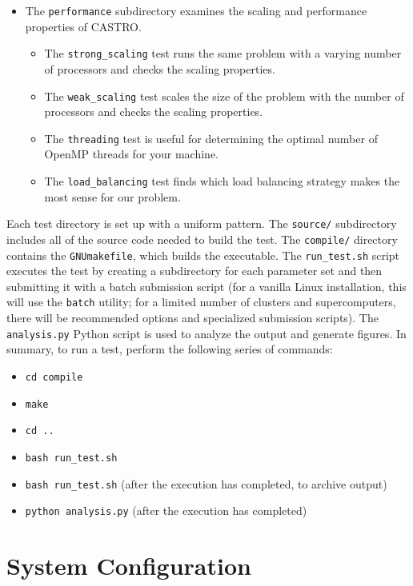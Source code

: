 \documentclass[12pt]{book}
\begin{document}
\begin{itemize}
  \item The \texttt{performance} subdirectory examines the scaling and performance properties of CASTRO.
  \begin{itemize}
    \item The \texttt{strong\_scaling} test runs the same problem with a varying number of processors and 
      checks the scaling properties.
    \item The \texttt{weak\_scaling} test scales the size of the problem with the number of processors and
      checks the scaling properties.
    \item The \texttt{threading} test is useful for determining the optimal number of OpenMP threads for your machine.
    \item The \texttt{load\_balancing} test finds which load balancing strategy makes the most sense for our problem.
  \end{itemize}
\end{itemize}

Each test directory is set up with a uniform pattern. The \texttt{source/} subdirectory includes all of the source code
needed to build the test. The \texttt{compile/} directory contains the \texttt{GNUmakefile}, which builds the executable.
The \texttt{run\_test.sh} script executes the test by creating a subdirectory
for each parameter set and then submitting it with a batch submission script (for a vanilla Linux installation,
this will use the \texttt{batch} utility; for a limited number of clusters and supercomputers, 
there will be recommended options and specialized submission scripts). The \texttt{analysis.py} Python script
is used to analyze the output and generate figures. In summary, to run a test, perform the following series of commands:
\begin{itemize}
  \item \texttt{cd compile}
  \item \texttt{make}
  \item \texttt{cd ..}
  \item \texttt{bash run\_test.sh}
  \item \texttt{bash run\_test.sh} (after the execution has completed, to archive output)
  \item \texttt{python analysis.py} (after the execution has completed)
\end{itemize}



\chapter{System Configuration}
\end{document}
